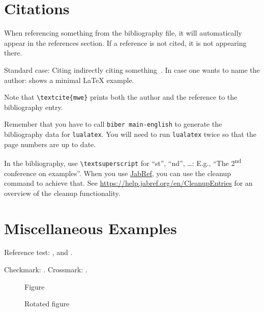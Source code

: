 \section{Citations}

When referencing something from the bibliography file, it will automatically appear in the references section.
If a reference is not cited, it is not appearing there.

\begin{ltgexample}
Standard case: Citing indirectly citing something~\cite{mwe}.
In case one wants to name the author: \textcite{mwe} shows a minimal \LaTeX{} example.
\end{ltgexample}

Note that \texttt{\textbackslash textcite\{mwe\}} prints both the author and the reference to the bibliography entry.

Remember that you have to call \texttt{biber main-english} to generate the bibliography data for \texttt{lualatex}.
You will need to run \texttt{lualatex} twice so that the page numbers are up to date.


In the bibliography, use \texttt{\textbackslash textsuperscript} for \enquote{st}, \enquote{nd}, \ldots:
E.g., \enquote{The 2\textsuperscript{nd} conference on examples}.
When you use \href{https://www.jabref.org}{JabRef}, you can use the cleanup command to achieve that.
See \url{https://help.jabref.org/en/CleanupEntries} for an overview of the cleanup functionality.

\section{Miscellaneous Examples}
\label{ssec:example}

Reference test: ,  and .

\begin{ltgexample}
Checkmark: \dingcheck.
Crossmark: \dingcross.
\end{ltgexample}

\begin{figure}
  \missingfigure{}
  \caption{Figure}
  \label{fig:Abbildung}
\end{figure}

\begin{landscape}
  \begin{figure}
    \missingfigure{}
    \caption{Rotated figure}
    \label{fig:AbbildungGedreht}
  \end{figure}
\end{landscape}

